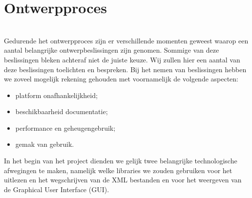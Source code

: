 \documentclass[a4paper,11pt]{article}
\begin{document}
\newpage\section{Ontwerpproces}\mbox{} \\
Gedurende het ontwerpproces zijn er verschillende momenten geweest waarop een aantal belangrijke ontwerpbeslissingen zijn genomen. Sommige van deze beslissingen bleken achteraf niet de juiste keuze. Wij zullen hier een aantal van deze beslissingen toelichten en bespreken. Bij het nemen van beslissingen hebben we zoveel mogelijk rekening gehouden met voornamelijk de volgende aspecten:
\begin{itemize}
	\item platform onafhankelijkheid;
	\item beschikbaarheid documentatie;
	\item performance en geheugengebruik;
	\item gemak van gebruik.
\end{itemize}

In het begin van het project dienden we gelijk twee belangrijke technologische afwegingen te maken, namelijk welke libraries we zouden gebruiken voor het uitlezen en het wegschrijven van de XML bestanden en voor het weergeven van de Graphical User Interface (GUI).\\
\end{document}
